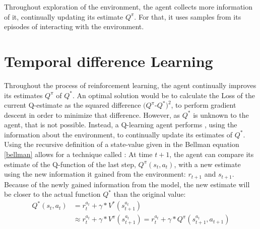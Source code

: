 Throughout exploration of the environment, the agent collects more information of it, continually updating its estimate $Q^\pi$. For that, it uses samples from its episodes of interacting with the environment. %


\section{Temporal difference Learning}



Throughout the process of reinforcement learning, the agent continually improves its estimates $Q^\pi$ of $Q^*$. An optimal solution would be to calculate the Loss of the current Q-estimate as the squared difference $(Q^\pi$-$Q^*)^2$, to perform gradient descent in order to minimize that difference. However, as $Q^*$ is unknown to the agent, that is not possible. Instead, a Q-learning agent performs , using the information about the environment, to continually update its estimates of $Q^*$.
\noindent Using the recursive definition of a state-value given in the Bellman equation \ref{bellman} allows for a technique called \cite{sutton1988}: At time $t+1$, the agent can compare its estimate of the Q-function of the last step, $Q^\pi(s_t, a_t)$, with a new estimate using the new information it gained from the environment: $r_{t+1}$ and $s_{t+1}$.  Because of the newly gained information from the model, the new estimate will be closer to the actual function $Q^*$ than the original value:
\begin{align} 
	Q^*(s_t,a_t) &= r_t^{a_t} + \gamma * V^*(s_{t+1}^{a_t})\\
				   &\approx r_t^{a_t} + \gamma * V^\pi(s_{t+1}^{a_t}) = r_t^{a_t} + \gamma * Q^\pi(s_{t+1}^{a_t},a_{t+1}) 
\end{align}

